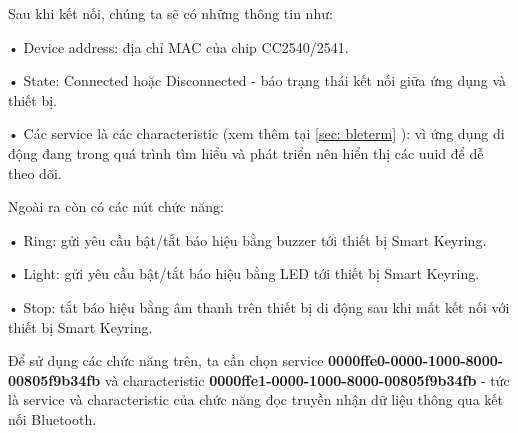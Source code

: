 	Sau khi kết nối, chúng ta sẽ có những thông tin như:
	
	• Device address: địa chỉ MAC của chip CC2540/2541.
	
	• State: Connected hoặc Disconnected -  báo trạng thái kết nối giữa ứng dụng và thiết bị.
	
	• Các service là các characteristic (xem thêm tại \ref{sec: bleterm} ): vì ứng dụng di động đang trong quá trình tìm hiểu và phát triển nên hiển thị các uuid để dễ theo dõi.
	
	Ngoài ra còn có các nút chức năng:
	
	• Ring: gửi yêu cầu bật/tắt báo hiệu bằng buzzer tới thiết bị Smart Keyring.
	
	• Light: gửi yêu cầu bật/tắt báo hiệu bằng LED tới thiết bị Smart Keyring.
	
	• Stop: tắt báo hiệu bằng âm thanh trên thiết bị di động sau khi mất kết nối với thiết bị Smart Keyring.
	
	Để sử dụng các chức năng trên, ta cần chọn service \textbf{0000ffe0-0000-1000-8000-00805f9b34fb} và characteristic \textbf{0000ffe1-0000-1000-8000-00805f9b34fb} - tức là service và characteristic của chức năng đọc truyền nhận dữ liệu thông qua kết nối Bluetooth.
	
